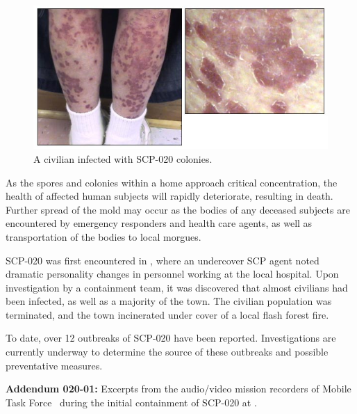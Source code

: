 \begin{figure}[h]
\begin{center}
\includegraphics[scale=0.5]{scp/020b.jpg}
\linebreak A civilian infected with SCP-020 colonies.
\end{center}
\end{figure}

As the spores and colonies within a home approach critical concentration, the health of affected human subjects will rapidly deteriorate, resulting in death. Further spread of the mold may occur as the bodies of any deceased subjects are encountered by emergency responders and health care agents, as well as transportation of the bodies to local morgues.

SCP-020 was first encountered in \expunged, where an undercover SCP agent noted dramatic personality changes in personnel working at the local hospital. Upon investigation by a containment team, it was discovered that almost  civilians had been infected, as well as a majority of the town. The civilian population was terminated, and the town incinerated under cover of a local flash forest fire.

To date, over 12 outbreaks of SCP-020 have been reported. Investigations are currently underway to determine the source of these outbreaks and possible preventative measures.

\textbf{Addendum 020-01:} Excerpts from the audio/video mission recorders of Mobile Task Force \expunged \ during the initial containment of SCP-020 at \expunged.

